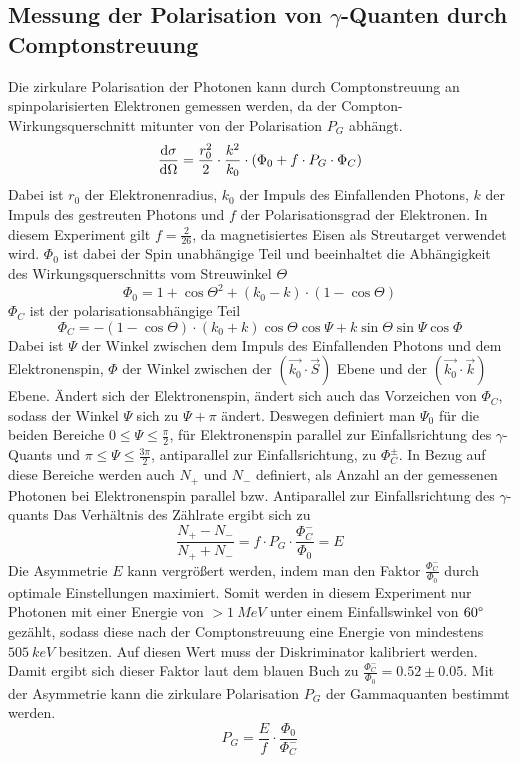 \subsection{Messung der Polarisation von $\gamma$-Quanten durch Comptonstreuung}
Die zirkulare Polarisation der Photonen kann durch Comptonstreuung an spinpolarisierten Elektronen gemessen werden, da der Compton-Wirkungsquerschnitt mitunter von der Polarisation $P_G$ abhängt. 
$$\odv{\sigma}{\Omega} = \frac{r_0^2}{2} \cdot \frac{k^2}{k_0} \cdot (\Phi_0 + f \cdot P_G \cdot \Phi_C)  $$
Dabei ist $r_0$ der Elektronenradius, $k_0$ der Impuls des Einfallenden Photons, $k$ der Impuls des gestreuten Photons und $f$ der Polarisationsgrad der Elektronen. In diesem Experiment gilt $f = \frac{2}{26}$, da magnetisiertes Eisen als Streutarget verwendet wird. 
$\Phi_0$ ist dabei der Spin unabhängige Teil und beeinhaltet die Abhängigkeit des Wirkungsquerschnitts vom Streuwinkel $\Theta$
$$\Phi_0 = 1 + \cos{\Theta}^2 + (k_0 - k)\cdot (1-\cos{\Theta})$$
$\Phi_C$ ist der polarisationsabhängige Teil
$$\Phi_C = -(1 -\cos{\Theta}) \cdot (k_0 + k) \cos{\Theta} \cos{\Psi}+ k \sin{\Theta} \sin{\Psi} \cos{\Phi}$$ 
Dabei ist $\Psi$ der Winkel zwischen dem Impuls des Einfallenden Photons und dem Elektronenspin, $\Phi$ der Winkel zwischen der $(\Vec{k_0}\cdot\Vec{S})$ Ebene und der $(\Vec{k_0}\cdot\Vec{k})$ Ebene.
Ändert sich der Elektronenspin, ändert sich auch das Vorzeichen von $\Phi_C$, sodass der Winkel $\Psi$ sich zu $\Psi + \pi$ ändert. Deswegen definiert man $\Psi_0$ für die beiden Bereiche $0 \leq \Psi \leq \frac{\pi}{2}$, für Elektronenspin parallel zur Einfallsrichtung des $\gamma$-Quants und $\pi \leq \Psi \leq \frac{3\pi}{2}$, antiparallel zur Einfallsrichtung, zu $\Phi_C^\pm$. In Bezug auf diese Bereiche werden auch $N_+$ und $N_-$ definiert, als Anzahl an der gemessenen Photonen bei Elektronenspin parallel bzw. Antiparallel zur Einfallsrichtung des $\gamma$-quants Das Verhältnis des Zählrate ergibt sich zu 
\begin{equation}
    \frac{N_+ - N_-}{N_+ + N_-} = f \cdot P_G \cdot \frac{\Phi_C^-}{\Phi_0} = E
    \label{Asymmetrie}
\end{equation}
Die Asymmetrie $E$ kann vergrößert werden, indem man den Faktor $\frac{\Phi_C^-}{\Phi_0}$ durch optimale Einstellungen maximiert. Somit werden in diesem Experiment nur Photonen mit einer Energie von $> \SI{1}{MeV}$ unter einem Einfallswinkel von $60 \degree$ gezählt, sodass diese nach der Comptonstreuung eine Energie von mindestens $\SI{505}{keV}$ besitzen. Auf diesen Wert muss der Diskriminator kalibriert werden. Damit ergibt sich dieser Faktor laut dem blauen Buch zu $\frac{\Phi_C^-}{\Phi_0} = 0.52 \pm 0.05$. \cite{BlueBook} 
Mit der Asymmetrie kann die zirkulare Polarisation $P_G$ der Gammaquanten bestimmt werden. 
\begin{equation}
    P_G = \frac{E}{f}\cdot \frac{\Phi_0}{\Phi_C^-}
    \label{Polarisation}
\end{equation}
